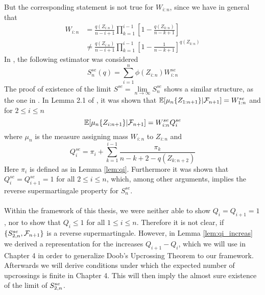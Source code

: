 %
But the corresponding statement is not true for $W_{i:n}$, since we have in general that
\begin{align*}
W_{i:n} &= \frac{q(Z_{i:n})}{n-i+1}\prod\limits_{k=1}^{i-1}\left[1-\frac{q(Z_{k:n})}{n-k+1}\right] \\
&\neq \frac{q(Z_{i:n})}{n-i+1}\prod\limits_{k=1}^{i-1}\left[1-\frac{1}{n-k+1}\right]^{q(Z_{k:n})}
\end{align*}
%
In \cite{dikta2000strong}, the following estimator was considered
$$S_n^{se}(q) = \sum_{i=1}^n \phi(Z_{i:n}) W_{i:n}^{se}$$
The proof of existence of the limit $S^{se} = \lim\limits_{n\to\infty} S_n^{se}$ shows a similar structure, as the one in \cite{bose1999strong}. In Lemma 2.1 of \cite{dikta2000strong}, it was shown that $\mathbb{E}[\mu_n\{Z_{1:n+1}\} | \mathcal{F}_{n+1}] = W_{1:n}^{se}$ and for $2\leq i\leq n$
$$\mathbb{E}[\mu_n\{Z_{i:n+1}\} | \mathcal{F}_{n+1}] = W_{i:n}^{se}Q_i^{se}$$
where $\mu_n$ is the measure assigning mass $W_{i:n}$ to  $Z_{i:n}$ and
$$Q_i^{se} = \pi_i + \sum_{k=1}^{i-1} \frac{\pi_k}{n-k+2-q(Z_{k:n+2})}$$
Here $\pi_i$ is defined as in Lemma \ref{lem:qi}. Furthermore it was shown that $Q_i^{se} = Q_{i+1}^{se} = 1$ for all $2\leq i\leq n$, which, among other arguments, implies the reverse supermartingale property for $S_n^{se}$.\\
\\
Within the framework of this thesis, we were neither able to show $Q_i = Q_{i+1} = 1$, nor to show that $Q_i \leq 1$ for all $1\leq i\leq n$. Therefore it is not clear, if $\{S_{2,n}^{se}, \mathcal{F}_{n+1}\}$ is a reverse supermartingale. However, in Lemma \ref{lem:qi_increas} we derived a representation for the increases $Q_{i+1} - Q_i$, which we will use in Chapter 4 in order to  generalize Doob's Upcrossing Theorem to our framework. Afterwards we will derive conditions under which the expected number of upcrossings is finite in Chapter 4. This will then imply the almost sure existence of the limit of $S_{2,n}^{se}$.

